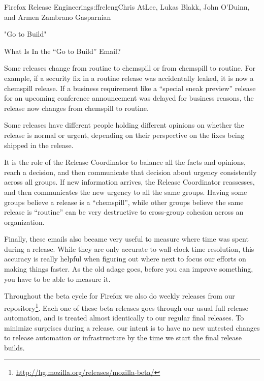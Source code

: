 \begin{aosachapter}{Firefox Release Engineering}{s:ffreleng}{Chris AtLee, Lukas Blakk, John O'Duinn, and Armen Zambrano Gasparnian}
\begin{aosasect1}{"Go to Build"}
\begin{aosasect2}{What Is In the ``Go to Build'' Email?}
\begin{aosaenumerate}
\begin{aosaenumerate2}
    \item Some releases change from routine to chemspill or
      from chemspill to routine. For example, if a security
      fix in a routine release was accidentally leaked, it is now
      a chemspill release. If a business requirement like a
      ``special sneak preview'' release for an upcoming
      conference announcement was delayed for business
      reasons, the release now changes from chemspill to
      routine.

    \item Some releases have different people holding different
      opinions on whether the release is normal or urgent,
      depending on their perspective on the fixes being shipped in the
      release.

  \end{aosaenumerate2}

\end{aosaenumerate}

It is the role of the Release Coordinator to balance all the facts and
opinions, reach a decision, and then communicate that decision about
urgency consistently across all groups. If new information arrives,
the Release Coordinator reassesses, and then communicates the new
urgency to all the same groups. Having some groups believe a release
is a ``chemspill'', while other groups believe the same release is ``routine''
can be very destructive to cross-group cohesion across an
organization.

Finally, these emails also became very useful to measure where time
was spent during a release.  While they are only accurate to
wall-clock time resolution, this accuracy is really helpful when
figuring out where next to focus our efforts on making things faster.
As the old adage goes, before you can improve something, you
have to be able to measure it.

Throughout the beta cycle for Firefox we also do weekly releases from
our 
repository\footnote{\url{http://hg.mozilla.org/releases/mozilla-beta/}}. Each
one of these beta releases goes through our usual full release
automation, and is treated almost identically to our regular final
releases. To minimize surprises during a release, our intent is to
have no new untested changes to release automation or
infrastructure by the time we start the final release builds.

\end{aosasect2}

\end{aosasect1}


\end{aosachapter}
